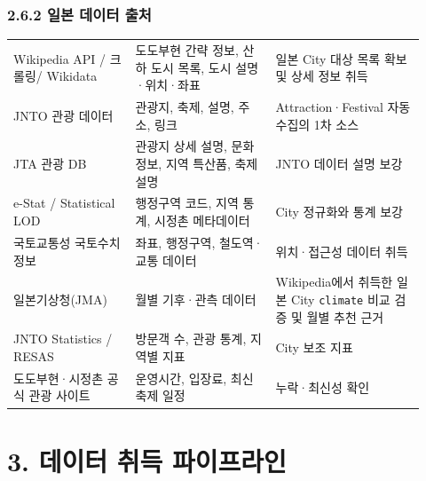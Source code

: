 \documentclass[12pt,a4paper]{article}
\newcommand{\DocNeedspace}[1]{\par\ifdim\dimexpr\pagegoal-\pagetotal\relax<#1\newpage\fi}
\begin{document}
\newpage

\DocNeedspace{5\baselineskip}
\subsubsection*{2.6.2 일본 데이터 출처}


\DocNeedspace{22\baselineskip}
\begin{small}
\begin{longtable}{@{}>{\centering\arraybackslash}m{0.274\linewidth}>{\RaggedRight\arraybackslash}m{0.313\linewidth}>{\RaggedRight\arraybackslash}m{0.333\linewidth}@{}}
\toprule
\multicolumn{1}{>{\centering\arraybackslash}m{0.274\linewidth}}{\textbf{출처}} & \multicolumn{1}{>{\centering\arraybackslash}m{0.313\linewidth}}{\textbf{취득 데이터}} & \multicolumn{1}{>{\centering\arraybackslash}m{0.333\linewidth}}{\textbf{적용 방식}} \\
\midrule
\endhead
Wikipedia API / 크롤링\newline / Wikidata & 도도부현 간략 정보, 산하 도시 목록, 도시 설명·위치·좌표 & 일본 City 대상 목록 확보 및 상세 정보 취득 \\
JNTO 관광 데이터 & 관광지, 축제, 설명, 주소, 링크 & Attraction·Festival 자동 수집의 1차 소스 \\
JTA 관광 DB & 관광지 상세 설명, 문화 정보, 지역 특산품, 축제 설명 & JNTO 데이터 설명 보강 \\
e-Stat / Statistical LOD & 행정구역 코드, 지역 통계, 시정촌 메타데이터 & City 정규화와 통계 보강 \\
국토교통성 국토수치정보 & 좌표, 행정구역, 철도역·교통 데이터 & 위치·접근성 데이터 취득 \\
일본기상청(JMA) & 월별 기후·관측 데이터 & Wikipedia에서 취득한 일본 City \texttt{climate} 비교 검증 및 월별 추천 근거 \\
JNTO Statistics / RESAS & 방문객 수, 관광 통계, 지역별 지표 & City 보조 지표 \\
도도부현·시정촌 공식 관광 사이트 & 운영시간, 입장료, 최신 축제 일정 & 누락·최신성 확인 \\
\bottomrule
\end{longtable}
\end{small}


\newpage

\DocNeedspace{10\baselineskip}
\section*{3. 데이터 취득 파이프라인}
\end{document}
